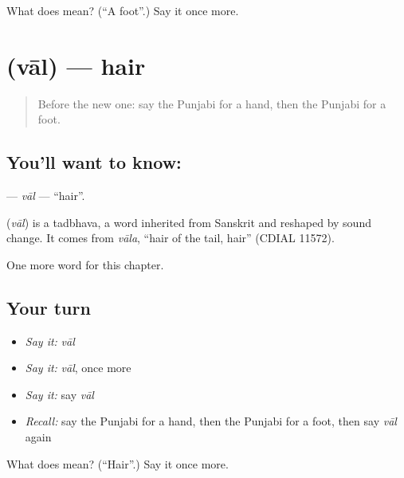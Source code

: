 \begin{tcolorbox}[breakable,colback=teal!4,colframe=teal!35!black,title={Before you move on}]
What does  mean? (\textquotedblleft{}A foot\textquotedblright{}.) Say it once more.
\end{tcolorbox}
\section[\texorpdfstring{\pa{ਵਾਲ} (vāl)}{ਵਾਲ (vāl)}]{ (vāl) — hair}

\label{lesson:PA-C49-val}



\begin{quote}
Before the new one: say the Punjabi for a hand, then the Punjabi for a foot.
\end{quote}

\subsection*{You'll want to know: }
\textbf{} — \emph{vāl} — \textquotedblleft{}hair\textquotedblright{}.

\begin{cousinweb}
\textbf{} (\emph{vāl}) is a tadbhava, a word inherited from Sanskrit and reshaped by sound change. It comes from \emph{vāla}, \textquotedblleft{}hair of the tail, hair\textquotedblright{} (CDIAL 11572).
\end{cousinweb}

\begin{grammarlens}[title={What you've built}]
One more word for this chapter.
\end{grammarlens}

\subsection*{Your turn}
\begin{itemize}
\raggedright
  \item \emph{Say it:} \emph{vāl}
  \item \emph{Say it:} \emph{vāl}, once more
  \item \emph{Say it:} say \emph{vāl}
  \item \emph{Recall:} say the Punjabi for a hand, then the Punjabi for a foot, then say \emph{vāl} again
\end{itemize}

\begin{tcolorbox}[breakable,colback=teal!4,colframe=teal!35!black,title={Before you move on}]
What does  mean? (\textquotedblleft{}Hair\textquotedblright{}.) Say it once more.
\end{tcolorbox}
